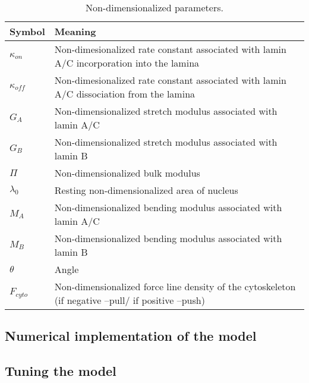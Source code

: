 \begin{table}[t!]
\caption{Non-dimensionalized parameters.}\centering \label{tab:nondimpar} 
\begin{tabular}{ l  l}
\hline
Symbol  & Meaning \\
\hline
$\kappa_{on}$ &  Non-dimesionalized rate constant associated with lamin A/C incorporation into the lamina\\
$\kappa_{off}$ &  Non-dimesionalized rate constant associated with lamin A/C dissociation from the lamina\\
$G_A$ & Non-dimensionalized stretch modulus associated with lamin A/C \\
$G_B$ &  Non-dimensionalized stretch modulus associated with lamin B\\
$\Pi$ &  Non-dimensionalized bulk modulus \\
$\lambda_0$ & Resting non-dimensionalized area of nucleus\\
$M_A$ & Non-dimensionalized bending modulus associated with lamin A/C\\
$M_B$  & Non-dimensionalized bending modulus associated with lamin B\\
$\theta$ & Angle   \\
$F_{cyto}$ &  Non-dimensionalized force line density of the cytoskeleton (if negative --pull/ if positive --push) \\
\hline
\end{tabular}
\end{table}


\subsection{Numerical implementation of the model}


\subsection{Tuning the model}






